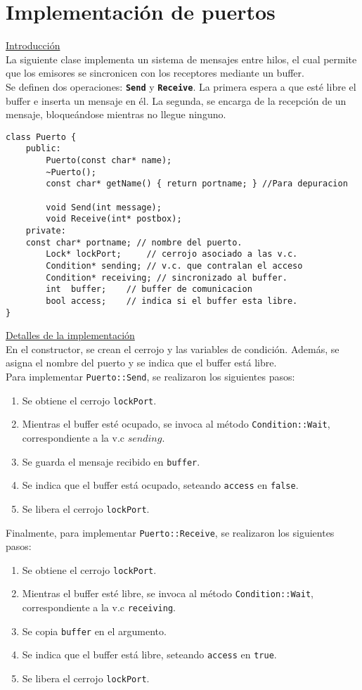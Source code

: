 \section{Implementación de puertos}
\textsf{\underline{Introducción}}\\
La siguiente clase implementa un sistema de mensajes entre hilos, el cual permite que los emisores se
sincronicen con los receptores mediante un buffer.\\
Se definen dos operaciones: \textbf{\texttt{Send}} y \textbf{\texttt{Receive}}. La primera espera a que esté libre el buffer e inserta un mensaje en él. La segunda, se encarga de la recepción de un mensaje, bloqueándose mientras no llegue ninguno.
\begin{lstlisting}[style=C]
class Puerto {
    public:
        Puerto(const char* name);
        ~Puerto();
        const char* getName() { return portname; } //Para depuracion

        void Send(int message);
        void Receive(int* postbox);
    private:
	const char* portname; // nombre del puerto.
        Lock* lockPort; 	// cerrojo asociado a las v.c.
        Condition* sending; // v.c. que contralan el acceso
        Condition* receiving; // sincronizado al buffer.
        int  buffer; 	// buffer de comunicacion
        bool access;	// indica si el buffer esta libre.
}
\end{lstlisting}
\textsf{\underline{Detalles de la implementación}}\\
En el constructor, se crean el cerrojo y las variables de condición. Además, se asigna el nombre del puerto y se indica que el buffer está libre.\\
Para implementar \texttt{Puerto::Send}, se realizaron los siguientes pasos:
\begin{enumerate}
	\item Se obtiene el cerrojo \texttt{lockPort}.
	\item Mientras el buffer esté ocupado, se invoca al método \texttt{Condition::Wait}, correspondiente a la v.c $sending$.
	\item Se guarda el mensaje recibido en \texttt{buffer}.
	\item Se indica que el buffer está ocupado, seteando \texttt{access} en \texttt{false}.
	\item Se libera el cerrojo \texttt{lockPort}.
\end{enumerate}
Finalmente, para implementar \texttt{Puerto::Receive}, se realizaron los siguientes pasos:
\begin{enumerate}
	\item Se obtiene el cerrojo \texttt{lockPort}.
	\item Mientras el buffer esté libre, se invoca al método \texttt{Condition::Wait}, correspondiente a la v.c \texttt{receiving}.
	\item Se copia \texttt{buffer} en el argumento.
	\item Se indica que el buffer está libre, seteando \texttt{access} en \texttt{true}.
	\item Se libera el cerrojo \texttt{lockPort}.
\end{enumerate}
